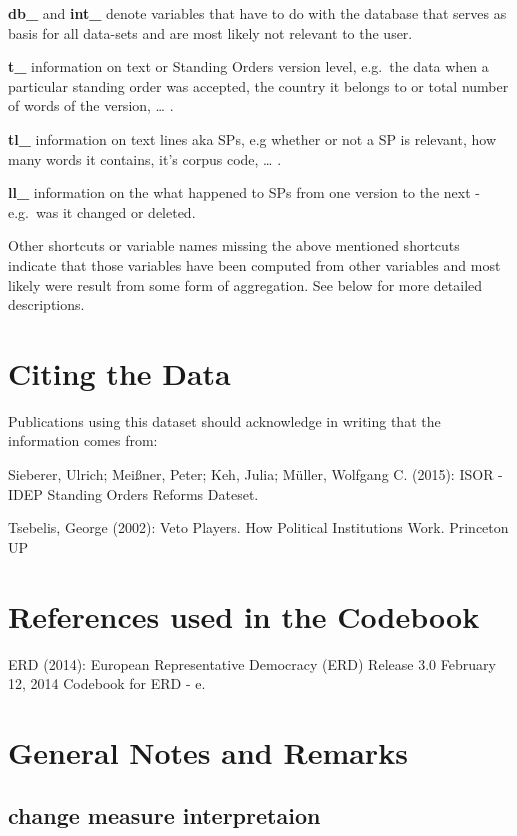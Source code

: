 \documentclass[]{article}
\begin{document}
\textbf{db\_} and \textbf{int\_} denote variables that have to do with
the database that serves as basis for all data-sets and are most likely
not relevant to the user.

\textbf{t\_} information on text or Standing Orders version level,
e.g.~the data when a particular standing order was accepted, the country
it belongs to or total number of words of the version, \ldots{} .

\textbf{tl\_} information on text lines aka SPs, e.g whether or not a SP
is relevant, how many words it contains, it's corpus code, \ldots{} .

\textbf{ll\_} information on the what happened to SPs from one version
to the next - e.g.~was it changed or deleted.

Other shortcuts or variable names missing the above mentioned shortcuts
indicate that those variables have been computed from other variables
and most likely were result from some form of aggregation. See below for
more detailed descriptions.

\section{Citing the Data}\label{citing-the-data}

Publications using this dataset should acknowledge in writing that the
information comes from:

Sieberer, Ulrich; Meißner, Peter; Keh, Julia; Müller, Wolfgang C.
(2015): ISOR - IDEP Standing Orders Reforms Dateset.

Tsebelis, George (2002): Veto Players. How Political Institutions Work.
Princeton UP

\section{References used in the
Codebook}\label{references-used-in-the-codebook}

ERD (2014): European Representative Democracy (ERD) Release 3.0 February
12, 2014 Codebook for ERD - e.

\section{General Notes and Remarks}\label{general-notes-and-remarks}

\subsection{change measure
interpretaion}\label{change-measure-interpretaion}
\end{document}

